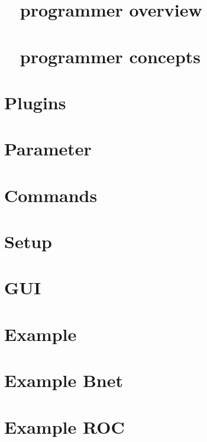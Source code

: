 
\chapter{\dabc~ programmer overview}
 \cleardoublepage
\chapter{\dabc~ programmer concepts}
 \cleardoublepage
\chapter{Plugins}
 \cleardoublepage
\chapter{Parameter}
 \cleardoublepage
\chapter{Commands}
 \cleardoublepage
\chapter{Setup}
 \cleardoublepage
\chapter{GUI}
 \cleardoublepage
\chapter{Example \mbs}
 \cleardoublepage
\chapter{Example Bnet}
 \cleardoublepage
\chapter{Example ROC}
 \cleardoublepage
